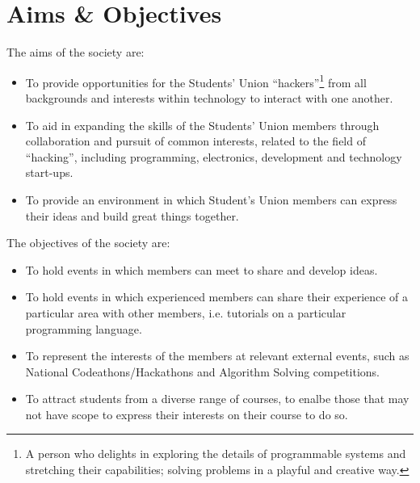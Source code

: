 \section*{Aims \& Objectives}
\begin{clause}
The aims of the society are:
	\begin{itemize}
		\item To provide opportunities for the Students' Union ``hackers''\footnote{A person who delights in exploring the details of programmable systems and stretching their capabilities; solving problems in a playful and 		creative way.} from all backgrounds and interests within technology to interact with one another.
		\item To aid in expanding the skills of the Students' Union members through collaboration and pursuit of common interests, related to the field of ``hacking'', including programming, electronics, development and technology start-ups.
		\item To provide an environment in which Student's Union members can express their ideas and build great things together.
	\end{itemize}
\end{clause}
\begin{clause}
The objectives of the society are:
	\begin{itemize}
		\item To hold events in which members can meet to share and develop ideas.
		\item To hold events in which experienced members can share their experience of a particular area with other members, i.e. tutorials on a particular programming language.
		\item To represent the interests of the members at relevant external events, such as National Codeathons/Hackathons and Algorithm Solving competitions.
		\item To attract students from a diverse range of courses, to enalbe those that may not have scope to express their interests on their course to do so.
	\end{itemize}
\end{clause}